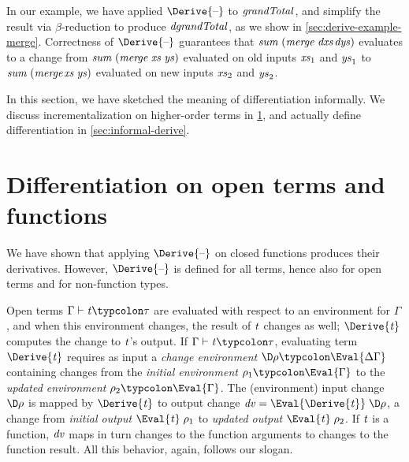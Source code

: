 In our example, we have applied \ensuremath{\Derive{\text{\textendash}}} to
\ensuremath{\Varid{grandTotal}}, and simplify the result via
$\beta$-reduction to produce \ensuremath{\Varid{dgrandTotal}}, as we show in \cref{sec:derive-example-merge}.
Correctness of \ensuremath{\Derive{\text{\textendash}}} guarantees
that \ensuremath{\Varid{sum}\;(\Varid{merge}\;\Varid{dxs}}\linebreak\ensuremath{\Varid{dys})} evaluates to a change from
\ensuremath{\Varid{sum}\;(\Varid{merge}\;\Varid{xs}\;\Varid{ys})} evaluated on old inputs \ensuremath{\Varid{xs}_{1}} and \ensuremath{\Varid{ys}_{1}} to
\ensuremath{\Varid{sum}\;(\Varid{merge}}\linebreak\ensuremath{\Varid{xs}\;\Varid{ys})} evaluated on new inputs \ensuremath{\Varid{xs}_{2}} and \ensuremath{\Varid{ys}_{2}}.

In this section, we have sketched the meaning of differentiation
informally. We discuss incrementalization on higher-order
terms in \cref{sec:higher-order-intro}, and actually define
differentiation in \cref{sec:informal-derive}.


\section{Differentiation on open terms and functions}
\label{sec:higher-order-intro}
We have shown that applying \ensuremath{\Derive{\text{\textendash}}} on closed functions produces their
derivatives. However, \ensuremath{\Derive{\text{\textendash}}} is defined for all terms, hence also for open
terms and for non-function types.

Open terms \ensuremath{\Gamma\vdash\Varid{t}\typcolon\tau} are evaluated with respect to an environment for
\ensuremath{\Gamma}, and when this environment changes, the result of \ensuremath{\Varid{t}} changes as well;
\ensuremath{\Derive{\Varid{t}}} computes the change to \ensuremath{\Varid{t}}'s output.
If \ensuremath{\Gamma\vdash\Varid{t}\typcolon\tau}, evaluating term \ensuremath{\Derive{\Varid{t}}} requires as input a
\emph{change environment} \ensuremath{\D\rho\typcolon\Eval{\Delta \Gamma}} containing changes from the \emph{initial
environment} \ensuremath{\rho_{1}\typcolon\Eval{\Gamma}} to the \emph{updated environment} \ensuremath{\rho_{2}\typcolon\Eval{\Gamma}}.
The (environment) input change \ensuremath{\D\rho} is mapped by \ensuremath{\Derive{\Varid{t}}} to output change
\ensuremath{\Varid{dv}\mathrel{=}\Eval{\Derive{\Varid{t}}}\;\D\rho}, a change from \emph{initial output} \ensuremath{\Eval{\Varid{t}}\;\rho_{1}} to \emph{updated output} \ensuremath{\Eval{\Varid{t}}\;\rho_{2}}. If \ensuremath{\Varid{t}} is a function,
\ensuremath{\Varid{dv}} maps in turn changes to the function arguments to changes to the function
result. All this behavior, again, follows our slogan.

